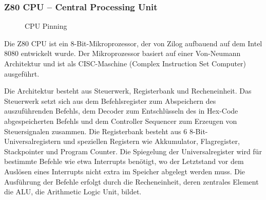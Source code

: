 \subsubsection{Z80 CPU -- Central Processing Unit}
\begin{figure}[H]
    \qquad
    \qquad
    \caption[Z80 CPU Pinning]{CPU Pinning}
    \label{fig:z80-cpu-pinning}
\end{figure}

Die Z80 CPU ist ein 8-Bit-Mikroprozessor, der von Zilog aufbauend auf dem Intel 8080 entwickelt wurde. Der Mikroprozessor basiert auf einer Von-Neumann Architektur und ist als CISC-Maschine (Complex Instruction Set Computer) ausgeführt.

Die Architektur besteht aus Steuerwerk, Registerbank und Recheneinheit. Das Steuerwerk setzt sich aus dem Befehlsregister zum Abspeichern des auszuführenden Befehls, dem Decoder zum Entschlüsseln des in Hex-Code abgespeicherten Befehls und dem Controller Sequencer zum Erzeugen von Steuersignalen zusammen. Die Registerbank besteht aus 6 8-Bit-Universalregistern und speziellen Registern wie Akkumulator, Flagregister, Stackpointer und Program Counter. Die Spiegelung der Universalregister wird für bestimmte Befehle wie etwa Interrupts benötigt, wo der Letztstand vor dem Auslösen eines Interrupts nicht extra im Speicher abgelegt werden muss. Die Ausführung der Befehle erfolgt durch die Recheneinheit, deren zentrales Element die ALU, die Arithmetic Logic Unit, bildet.

